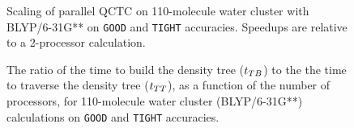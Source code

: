 \commentoutA{\documentclass[prl,aps,twocolumn,twocolumngrid,superbib]{revtex4}}
\begin{document}
\begin{figure}[t]
\caption{ 
Scaling of parallel QCTC on 110-molecule water cluster with
BLYP/6-31G** on {\tt GOOD} and {\tt TIGHT} accuracies.  Speedups are
relative to a 2-processor calculation.  }
\label{fig:110WaterOnGoodAndTight}
\end{figure}

\begin{figure}[t]
\caption{ 
The ratio of the time to build the density tree ($t_{TB}$) to the the
time to traverse the density tree ($t_{TT}$), as a function of the
number of processors, for 110-molecule water cluster (BLYP/6-31G**)
calculations on {\tt GOOD} and {\tt TIGHT} accuracies.}
\label{fig:NProc_TRatio_110H2O_GoodAndTight}
\end{figure}
\end{document}
